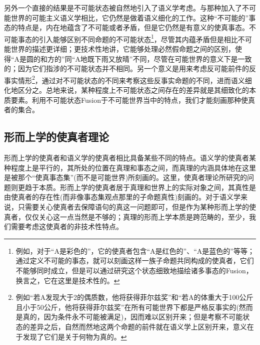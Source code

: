 \documentclass{article}
\begin{document}
另外一个直接的结果是不可能状态被自然地引入了语义学考虑。与那种加入了不可能世界的可能主义语义学相比，它仍然是做着语义细化的工作。这种“不可能的”事态的特点是，内在地蕴含了不可能或者矛盾，但是它仍然是有意义的使真事态。不可能事态的引入能够区别不同命题的不可能状态\footnote{例如，对于“A是彩色的”，它的使真者包含“A是红色的”、“A是蓝色的”等等；通过定义不可能的事态，就可以刻画这样一族子命题共同构成的使真者，它们不能够同时成立，但是可以通过研究这个状态细致地描绘诸多事态的Fusion，换言之，它在这里是技术性的。}，尽管其内蕴矛盾但是相比不可能世界的描述更详细；更技术性地讲，它能够处理必然假命题之间的区别，使得“A是圆的和方的”同“A地既下雨又放晴”不同，尽管在可能世界的意义下是一致的；因为它们指涉的不可能状态并不相同。另一个意义是用来考虑反可能前件的反事实情形\footnote{例如“若A发现大于2的偶质数，他将获得菲尔兹奖”和“若A的体重大于100公斤且小于50公斤，他将获得菲尔兹奖”在所有可能世界下都是严格反事实的(然而是真的，因为条件永不可能被满足)，因而难以区别开来；但是考察不可能状态的差异之后，自然而然地这两个命题的前件就在语义学上区别开来，意义在于发现了它们是关于何物为真的。}，通过对不可能状态的不同来考察这些反事实命题的不同，进而语义细化地区分之。总地来说，某种程度上不可能状态之间存在的差异就是其细致化的本质要素。利用不可能状态Fusion于不可能世界当中的特点，我们才能刻画那种使真者的集合。
\subsection{形而上学的使真者理论}
形而上学的使真者和语义学的使真者相比具备某些不同的特点。语义学的使真者某种程度上是平行的，其所处的位置在真理和事态之间，而真理的内涵具体地在这里是被那个“使真事态集”(而不是可能世界)所刻画的。这里，使真者理论所研究的问题则更趋于本质。形而上学的使真者居于真理和世界上的实际对象之间，其真性是由使真者的存在性(而非像事态集观点那里的子命题真性)刻画的。对于语义学来说，只需要关心使真者去保障语句的真这一问题即可，但是作为某种形而上学的使真者，仅仅关心这一点当然是不够的；真理的形而上学本质是跨范畴的，至少，我们需要考虑这使真者的非技术性特点。
\end{document}
